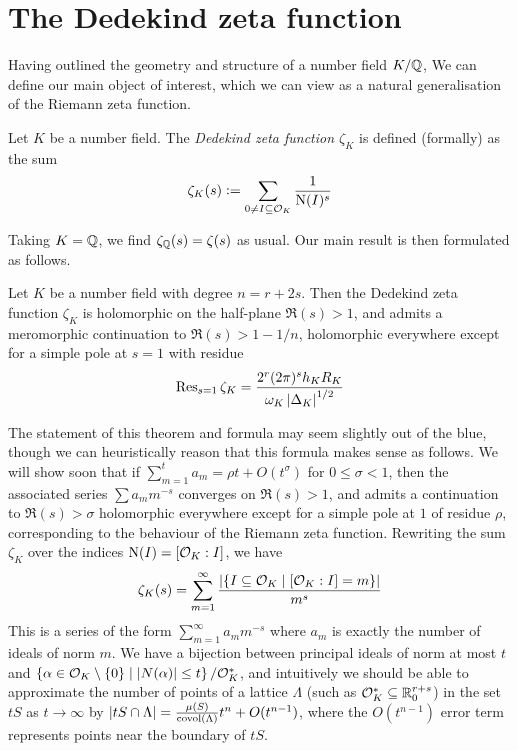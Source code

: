 \documentclass[11pt]{report}
\begin{document}
\section{The Dedekind zeta function}
Having outlined the geometry and structure of a number field $K / \mathbb{Q}$, We can define our main object of interest, which we can view as a natural generalisation of the Riemann zeta function.
\begin{definition}
    Let $K$ be a number field. The \emph{Dedekind zeta function $\zeta_K$} is defined (formally) as the sum
    $$
        \zeta_K(s) \vcentcolon= \sum_{0 \neq I \subseteq \mathcal{O}_K} \frac1{\operatorname{N}(I)^s}
    $$
\end{definition}
Taking $K = \mathbb{Q}$, we find $\zeta_{\mathbb{Q}}(s) = \zeta(s)$ as usual. Our main result is then formulated as follows.
\begin{theorem}\label{acnf1}
    Let $K$ be a number field with degree $n = r + 2s$. Then the Dedekind zeta function $\zeta_K$ is holomorphic on the half-plane $\Re(s) > 1$, and admits a meromorphic continuation to $\Re(s) > 1 - 1/n$, holomorphic everywhere except for a simple pole at $s = 1$ with residue
    $$
        \operatorname{Res}_{s = 1}\zeta_K = \frac{2^r(2\pi)^sh_KR_K}{\omega_K\left| \Delta_K \right|^{1/2}}
    $$
\end{theorem}
The statement of this theorem and formula may seem slightly out of the blue, though we can heuristically reason that this formula makes sense as follows. We will show soon that if $\sum_{m = 1}^t a_m = \rho t + O(t^\sigma)$ for $0 \leq \sigma < 1$, then the associated series $\sum a_mm^{-s}$ converges on $\Re(s) > 1$, and admits a continuation to $\Re(s) > \sigma$ holomorphic everywhere except for a simple pole at $1$ of residue $\rho$, corresponding to the behaviour of the Riemann zeta function. Rewriting the sum $\zeta_K$ over the indices $\operatorname{N}(I) = [\mathcal{O}_K : I]$, we have
\begin{align}\label{coeffs}
    \zeta_K(s) = \sum_{m = 1}^\infty \frac{\left| \left\{  I \subseteq \mathcal{O}_K \mid [\mathcal{O}_K : I] = m  \right\} \right|}{m^s}
\end{align}
This is a series of the form $\sum_{m = 1}^\infty a_mm^{-s}$ where $a_m$ is exactly the number of ideals of norm $m$. We have a bijection between principal ideals of norm at most $t$ and $\left\{  \alpha \in \mathcal{O}_K \setminus \left\{  0  \right\} \mid \left| N(\alpha) \right| \leq t  \right\} / \mathcal{O}_K^*$, and intuitively we should be able to approximate the number of points of a lattice $\Lambda$ (such as $\mathcal{O}_K^* \subseteq \mathbb{R}_0^{r + s}$) in the set $tS$ as $t \to \infty$ by $\left| tS \cap \Lambda \right| = \frac{\mu(S)}{\operatorname{covol}(\Lambda)}t^n + O(t^{n - 1})$, where the $O(t^{n - 1})$ error term represents points near the boundary of $tS$. 
\end{document}
